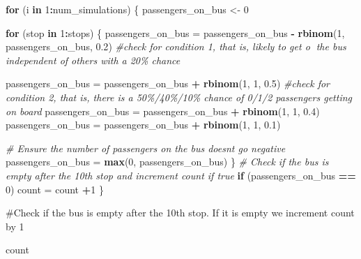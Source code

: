 \documentclass[
]{article}
\newenvironment{Shaded}{\begin{snugshade}}{\end{snugshade}}
\newcommand{\CommentTok}[1]{\textcolor[rgb]{0.56,0.35,0.01}{\textit{#1}}}
\newcommand{\ControlFlowTok}[1]{\textcolor[rgb]{0.13,0.29,0.53}{\textbf{#1}}}
\newcommand{\DecValTok}[1]{\textcolor[rgb]{0.00,0.00,0.81}{#1}}
\newcommand{\FloatTok}[1]{\textcolor[rgb]{0.00,0.00,0.81}{#1}}
\newcommand{\FunctionTok}[1]{\textcolor[rgb]{0.13,0.29,0.53}{\textbf{#1}}}
\newcommand{\NormalTok}[1]{#1}
\newcommand{\OtherTok}[1]{\textcolor[rgb]{0.56,0.35,0.01}{#1}}
\newcommand{\SpecialCharTok}[1]{\textcolor[rgb]{0.81,0.36,0.00}{\textbf{#1}}}
\begin{document}
\begin{Shaded}
\begin{Highlighting}[]
\ControlFlowTok{for}\NormalTok{ (i }\ControlFlowTok{in} \DecValTok{1}\SpecialCharTok{:}\NormalTok{num\_simulations) \{}
\NormalTok{  passengers\_on\_bus }\OtherTok{\textless{}{-}} \DecValTok{0}
  
  \ControlFlowTok{for}\NormalTok{ (stop }\ControlFlowTok{in} \DecValTok{1}\SpecialCharTok{:}\NormalTok{stops) \{}
\NormalTok{    passengers\_on\_bus }\OtherTok{=}\NormalTok{ passengers\_on\_bus }\SpecialCharTok{{-}} \FunctionTok{rbinom}\NormalTok{(}\DecValTok{1}\NormalTok{, passengers\_on\_bus, }\FloatTok{0.2}\NormalTok{) }\CommentTok{\#check for condition 1, that is, likely to get o the bus independent of others with a 20\% chance}
    
\NormalTok{    passengers\_on\_bus }\OtherTok{=}\NormalTok{ passengers\_on\_bus }\SpecialCharTok{+} \FunctionTok{rbinom}\NormalTok{(}\DecValTok{1}\NormalTok{, }\DecValTok{1}\NormalTok{, }\FloatTok{0.5}\NormalTok{) }\CommentTok{\#check for condition 2, that is, there is a 50\%/40\%/10\% chance of 0/1/2 passengers getting on board}
\NormalTok{    passengers\_on\_bus }\OtherTok{=}\NormalTok{ passengers\_on\_bus }\SpecialCharTok{+} \FunctionTok{rbinom}\NormalTok{(}\DecValTok{1}\NormalTok{, }\DecValTok{1}\NormalTok{, }\FloatTok{0.4}\NormalTok{) }
\NormalTok{    passengers\_on\_bus }\OtherTok{=}\NormalTok{ passengers\_on\_bus }\SpecialCharTok{+} \FunctionTok{rbinom}\NormalTok{(}\DecValTok{1}\NormalTok{, }\DecValTok{1}\NormalTok{, }\FloatTok{0.1}\NormalTok{) }
    
    \CommentTok{\# Ensure the number of passengers on the bus doesn\textquotesingle{}t go negative}
\NormalTok{    passengers\_on\_bus }\OtherTok{=} \FunctionTok{max}\NormalTok{(}\DecValTok{0}\NormalTok{, passengers\_on\_bus)}
\NormalTok{  \}}
  \CommentTok{\# Check if the bus is empty after the 10th stop and increment count if true}
  \ControlFlowTok{if}\NormalTok{ (passengers\_on\_bus }\SpecialCharTok{==} \DecValTok{0}\NormalTok{) }
\NormalTok{    count }\OtherTok{=}\NormalTok{ count }\SpecialCharTok{+}\DecValTok{1}
\NormalTok{\}}
\end{Highlighting}
\end{Shaded}

\#Check if the bus is empty after the 10th stop. If it is empty we
increment count by 1

\begin{Shaded}
\begin{Highlighting}[]
\NormalTok{count}
\end{Highlighting}
\end{Shaded}
\end{document}

